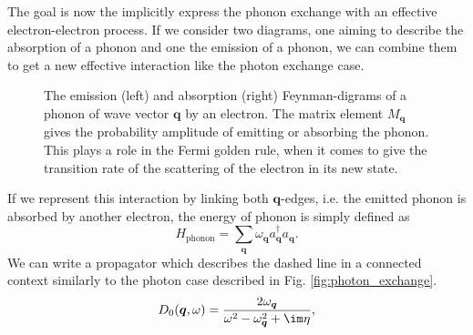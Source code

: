 \documentclass[../main.tex]{subfile}
\begin{document}
The goal is now the implicitly express the phonon exchange with an effective electron-electron process. If we consider two diagrams, one aiming to describe the absorption of a phonon
and one the emission of a phonon, we can combine them to get a new effective interaction like the photon exchange case.
\begin{figure}[H]
    \centering
     \hspace{2cm}
    \caption{The emission (left) and absorption (right) Feynman-digrams of a phonon of wave vector $\bm{q}$ by an electron.
    The matrix element $M_{\bm{q}}$ gives the probability amplitude of emitting or absorbing the phonon. This plays a role
    in the Fermi golden rule, when it comes to give the transition rate of the scattering of the electron in its new state.}
    \end{figure}
If we represent this interaction by linking both $\bm{q}$-edges, i.e. the emitted phonon is absorbed by another electron, the energy of phonon is simply defined as
\[
    H_{\text{phonon}} = \sum_{\bm{q}} \omega_{\bm{q}} a_{\bm{q}}^{\dagger}a_{\bm{q}}.
\]
We can write a propagator which describes the dashed line in a connected context similarly to the photon case described in Fig. \ref{fig:photon_exchange}.
\[
    D_0(\bm{q},\omega) = \frac{2\omega_{\bm{q}}}{\omega^2 - \omega_{\bm{q}}^2 + \im \eta},
\]
\end{document}
